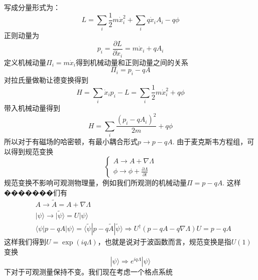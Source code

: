 \documentclass{article}
\numberwithin{equation}{subsection}
\begin{document}
写成分量形式为：
\begin{equation}
    L=\sum_{i}\frac{1}{2}m\dot{x}_i^2+\sum_iq\dot{x}_iA_i-q\phi
\end{equation}
正则动量为
\begin{equation}
    p_i=\frac{\partial L}{\partial\dot{x}_i}=m\dot{x}_i+qA_i
\end{equation}
定义机械动量$\Pi_i=m\dot{x}_i$得到机械动量和正则动量之间的关系
\begin{equation}
    \Pi_i=p_i-qA
\end{equation}
对拉氏量做勒让德变换得到
\begin{equation}
    H=\sum_{i}\dot{x}_ip_i-L=\sum_i\frac{1}{2}m\dot{x}_i^2+q\phi
\end{equation}
带入机械动量得到
\begin{equation}
    H=\sum_i\frac{(p_i-qA_i)^2}{2m}+q\phi
\end{equation}
所以对于有磁场的哈密顿，有最小耦合形式$p\rightarrow p-qA$. 由于麦克斯韦方程组，可以得到规范变换
\begin{equation}
    \begin{cases}
        A\rightarrow A+\nabla\Lambda\\
        \phi\rightarrow\phi+\frac{\partial\Lambda}{\partial t}
    \end{cases}
\end{equation}
规范变换不影响可观测物理量，例如我们所观测的机械动量$\Pi=p-qA$. 这样�������们有
\begin{equation}
    \begin{split}
        &A\longrightarrow\tilde{A}=A+\nabla\Lambda\\
        &|\psi\rangle\longrightarrow|\tilde{\psi}\rangle=U|\psi\rangle\\
        &\langle\psi|p-qA|\psi\rangle=\langle\tilde{\psi}|p-q\tilde{A}|\tilde{\psi}\rangle\Longrightarrow U^\dagger(p-qA-q\nabla\Lambda)U=p-qA
    \end{split}
\end{equation}
这样我们得到$U=\exp(iq\Lambda)$，也就是说对于波函数而言，规范变换是指$U(1)$变换
\begin{equation}
    |\psi\rangle\Longrightarrow e^{iq\Lambda}|\psi\rangle
\end{equation}
下对于可观测量保持不变。我们现在考虑一个格点系统
\begin{center}
\end{center}
\end{document}
